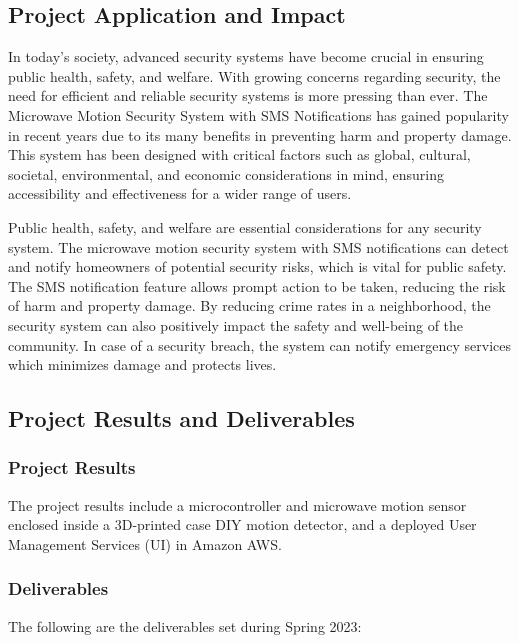 \subsection{Project Application and Impact}\label{subsec:project-application-and-impact}

In today's society, advanced security systems have become crucial in ensuring public
health, safety, and welfare. %
With growing concerns regarding security, the need for efficient and
reliable security systems is more pressing than ever. %
The Microwave Motion Security System with SMS Notifications has gained popularity in recent years
due to its many benefits in preventing harm and property damage. %
This system has been designed with critical factors such as global, cultural, societal, environmental,
and economic considerations in mind, ensuring accessibility and effectiveness for a
wider range of users. %

Public health, safety, and welfare are essential considerations for any security system. %
The microwave motion security system with SMS notifications can detect and notify
homeowners of potential security risks, which is vital for public safety. %
The SMS notification feature allows prompt action to be taken, reducing the risk of harm
and property damage. %
By reducing crime rates in a neighborhood, the security system
can also positively impact the safety and well-being of the community. %
In case of a security breach, the system can notify emergency services which minimizes damage and
protects lives. %

\subsection{Project Results and Deliverables}\label{subsec:project-results-and-deliverables}

\subsubsection{Project Results}

The project results include a microcontroller and microwave motion sensor
enclosed inside a 3D-printed case DIY motion detector, and a deployed User Management Services (UI) in Amazon AWS\@. %

\subsubsection{Deliverables}

The following are the deliverables set during Spring 2023:

